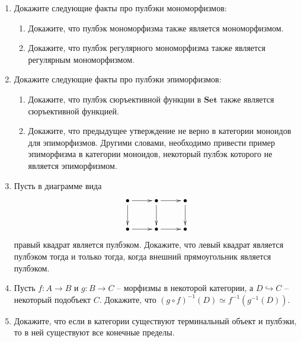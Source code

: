 \documentclass[draft]{article}
\newcommand{\cat}[1]{\mathbf{#1}}
\newcommand{\Set}{\cat{Set}}
\begin{document}
\begin{enumerate}
\item Докажите следующие факты про пулбэки мономорфизмов:
\begin{enumerate}
\item Докажите, что пулбэк мономорфизма также является мономорфизмом.
\item Докажите, что пулбэк регулярного мономорфизма также является регулярным мономорфизмом.
\end{enumerate}

\item Докажите следующие факты про пулбэки эпиморфизмов:
\begin{enumerate}
\item Докажите, что пулбэк сюръективной функции в $\Set$ также является сюръективной функцией.
\item Докажите, что предыдущее утверждение не верно в категории моноидов для эпиморфизмов. Другими словами, необходимо привести пример эпиморфизма в категории моноидов, некоторый пулбэк которого не является эпиморфизмом.
\end{enumerate}

\item Пусть в диаграмме вида
\[ \xymatrix{ \bullet \ar[r] \ar[d] & \bullet \ar[r] \ar[d] & \bullet \ar[d] \\
              \bullet \ar[r]        & \bullet \ar[r]        & \bullet
            } \]
правый квадрат является пулбэком.
Докажите, что левый квадрат является пулбэком тогда и только тогда, когда внешний прямоугольник является пулбэком.

\item Пусть $f : A \to B$ и $g : B \to C$ -- морфизмы в некоторой категории, а $D \hookrightarrow C$ -- некоторый подобъект $C$.
Докажите, что $(g \circ f)^{-1}(D) \simeq f^{-1}(g^{-1}(D))$.

\item Докажите, что если в категории существуют терминальный объект и пулбэки, то в ней существуют все конечные пределы.

\end{enumerate}
\end{document}
